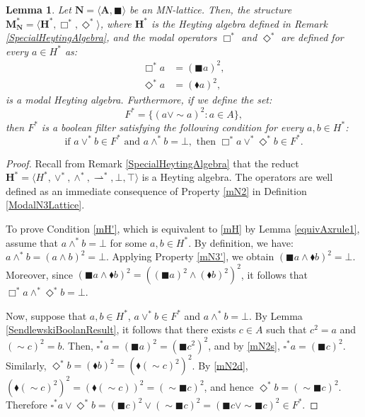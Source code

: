\documentclass[pdflatex,sn-mathphys-num]{sn-jnl}%
\newtheorem{lemma}{Lemma}
\newcommand{\A}{\mathbf{A}}
\newcommand{\He}{\mathbf{H}}
\theoremstyle{thmstyleone}%
\theoremstyle{thmstyletwo}%
\theoremstyle{thmstylethree}%
\begin{document}
\begin{lemma}\label{lemma Heytingfilter}
Let $\mathbf{N}=\langle \A,\blacksquare\rangle$ be an MN-lattice. Then, the structure $\mathbf{M}_\mathbf{N}^*=\langle{\He}^*, \Box^*, \Diamond^*\rangle$, where ${\He}^*$ is the Heyting algebra defined in Remark \ref{SpecialHeytingAlgebra}, and the modal operators $\Box^*$ and $\Diamond^*$ are defined for every $a \in H^*$ as:
\begin{align}
    \Box^* a &= (\blacksquare a)^2, \\
    \Diamond^* a &= (\blacklozenge a)^2,
\end{align}
is a modal Heyting algebra. Furthermore, if we define the set:
\[
   F^* = \{(a \vee \sim a)^2 : a \in A \},
\]
then $F^*$ is a boolean filter satisfying the following condition for every $a, b \in H^*$:
\[
   \text{if } a \vee^* b \in F^* \text{ and } a \wedge^* b = \bot, \text{ then } \Box^* a \vee^* \Diamond^* b \in F^*.
\]
\end{lemma}
\begin{proof}
Recall from Remark \ref{SpecialHeytingAlgebra} that the reduct ${\He}^* = \langle H^*,\vee^*,\wedge^*,\rightharpoonup^*,\bot,\top\rangle$ is a Heyting algebra. The operators are well defined as an immediate consequence of Property {\eqref{mN2}} in Definition \ref{ModalN3Lattice}. 

To prove Condition {\eqref{mH'}}, which is equivalent to {\eqref{mH}} by Lemma \ref{equivAxrule1}, assume that $a \wedge^* b = \bot$ for some $a, b \in H^*$. By definition, we have: $ a \wedge^* b = (a \wedge b)^2 = \bot$.
Applying Property {\eqref{mN3'}}, we obtain $(\blacksquare a \wedge \blacklozenge b)^2 = \bot$.
Moreover, since $(\blacksquare a \wedge \blacklozenge b)^2 = ((\blacksquare a)^2 \wedge (\blacklozenge b)^2)^2$,
it follows that $\Box^* a \wedge^* \Diamond^* b = \bot$.

Now, suppose that $a,b\in H^*$, $a\vee^*b\in F^*$ and $a\wedge^*b=\bot$. By Lemma \ref{SendlewskiBoolanResult}, it follows that there exists $c\in A$ such that $c^2=a$ and $(\sim c)^2=b$. Then, $\square^*a=(\blacksquare a)^2=(\blacksquare c^2)^2$, and by \eqref{mN2s}, $\square^*a=(\blacksquare c)^2$. Similarly, $\Diamond^*b=(\blacklozenge b)^2=(\blacklozenge(\sim c)^2)^2$. By \eqref{mN2d}, $(\blacklozenge(\sim c)^2)^2=(\blacklozenge(\sim c))^2=(\sim \blacksquare c)^2$, and hence $\Diamond^*b=(\sim \blacksquare c)^2$. Therefore $\square^*a\vee \Diamond^*b=(\blacksquare c)^2\vee(\sim \blacksquare c)^2=(\blacksquare c\vee \sim \blacksquare c)^2\in F^*$.
\end{proof}
\end{document}
